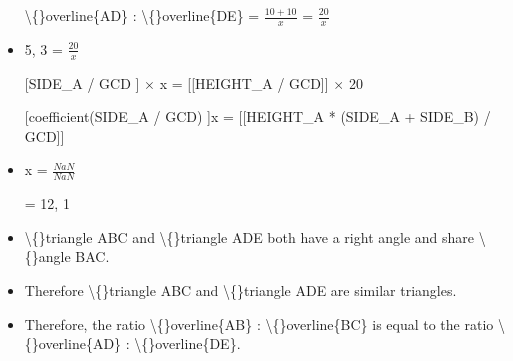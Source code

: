 \documentclass{article}
\begin{document}
\begin{itemize}
                        \textbackslash\{\}overline\{AD\} : \textbackslash\{\}overline\{DE\} = $\frac{10 + 10}{x}$
                            = $\frac{20}{x}$
  \item 5, 3 = $\frac{20}{x}$
  \item [[SIDE\_A / GCD]] $\times$ x =
                        [[HEIGHT\_A / GCD]] $\times$ 
                        20
  \item [[coefficient(SIDE\_A / GCD)]]x = [[HEIGHT\_A * (SIDE\_A + SIDE\_B) / GCD]]
  \item x = $\frac{NaN}{NaN}$
                        
                            = 12, 1
  \item \textbackslash\{\}triangle ABC and \textbackslash\{\}triangle ADE both have a right angle and share \textbackslash\{\}angle BAC.
  \item Therefore \textbackslash\{\}triangle ABC and \textbackslash\{\}triangle ADE are similar triangles.
  \item Therefore, the ratio \textbackslash\{\}overline\{AB\} : \textbackslash\{\}overline\{BC\}
                is equal to the ratio \textbackslash\{\}overline\{AD\} : \textbackslash\{\}overline\{DE\}.
\end{itemize}
\end{document}
